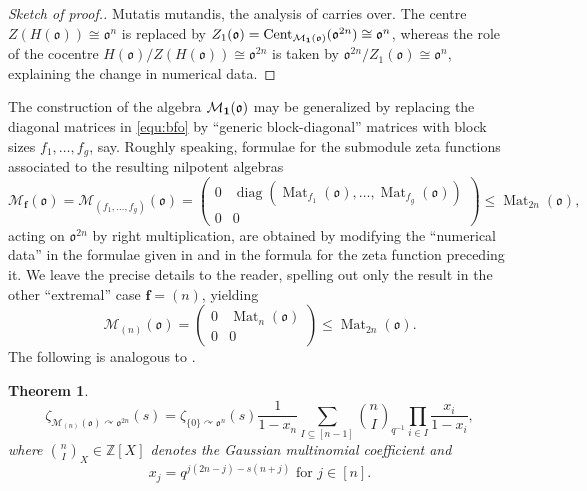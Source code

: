 \documentclass[11pt]{amsart}
\numberwithin{equation}{section}
\numberwithin{figure}{section}
\theoremstyle{plain}
\newtheorem{theorem}{Theorem}[section]
\theoremstyle{definition}
\theoremstyle{remark}
\begin{document}
\begin{proof}[Sketch of proof.] {Mutatis mutandis}, the analysis of
  \cite[Theorem~3.1]{SV1/15} carries over.  The centre
  $Z(H({\mathfrak o}))\cong {\mathfrak o}^n$ is replaced by $Z_1({\mathfrak o}) =
  \operatorname{Cent}_{{\mathcal{M}}_{{\bf 1}}({\mathfrak o})}({\mathfrak o}^{2n}) \cong {\mathfrak o}^n$, whereas the role
  of the cocentre $H({\mathfrak o}) / Z(H({\mathfrak o}))\cong {\mathfrak o}^{2n}$ is taken by
  ${\mathfrak o}^{2n} / Z_1({\mathfrak o})\cong {\mathfrak o}^n$, explaining the change in
  numerical data.
\end{proof}

The construction of the algebra ${\mathcal{M}}_{{\bf 1}}({\mathfrak o})$ may be generalized
by replacing the diagonal matrices in \eqref{equ:bfo} by
``generic block-diagonal'' matrices with block sizes $f_1,\dots,f_g$,
say. Roughly speaking, formulae for the submodule zeta functions
associated to the resulting nilpotent algebras
$${\mathcal{M}}_{\ensuremath{\mathbf{f}}}({\mathfrak o})= {\mathcal{M}}_{(f_1,\dots,f_g)}({\mathfrak o}) =
\left( \begin{matrix} 0 &
  \operatorname{diag}(\operatorname{Mat}_{f_1}({\mathfrak o}),\dots,\operatorname{Mat}_{f_g}({\mathfrak o}))\\0&0 \end{matrix}
\right) \leq \operatorname{Mat}_{2n}({\mathfrak o}),$$ acting on ${\mathfrak o}^{2n}$ by right
multiplication, are obtained by modifying the ``numerical data'' in
the formulae given in \cite[Theorem~3.6]{SV1/15} and in the formula
for the zeta function preceding it. We leave the precise details to
the reader, spelling out only the result in the other ``extremal''
case ${\ensuremath{\mathbf{f}}} = (n)$, yielding
$${\mathcal{M}}_{(n)}({\mathfrak o}) = \left( \begin{matrix} 0 & \operatorname{Mat}_{n}({\mathfrak o})
  \\0&0 \end{matrix} \right) \leq \operatorname{Mat}_{2n}({\mathfrak o}).$$
The following is analogous to \cite[Corollary~3.7]{SV1/15}.

\begin{theorem}\label{thm:abelian.inert}
\begin{equation}\label{equ:abelian.inert}
  \zeta_{{\mathcal{M}}_{(n)}({\mathfrak o}){\curvearrowright} {\mathfrak o}^{2n}}(s) = \zeta_{\{0\} {\curvearrowright} {\mathfrak o}^n}(s)\frac{1}{1-x_n}\sum_{I\subseteq[n-1]}\binom{n}{I}_{q^{-1}}\prod_{i\in
    I}\frac{x_i}{1-x_i}, 
\end{equation} where $\binom{n}{I}_X\in{\ensuremath{\mathbb{Z}}}[X]$ denotes the
Gaussian multinomial coefficient and
$$x_j = q^{j(2n-j)-s(n+j)} \text{ for }j\in[n].$$
\end{theorem}
\end{document}
